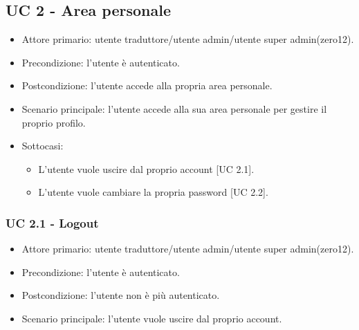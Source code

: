 \subsection{UC 2 - Area personale}
    \begin{itemize}
        \item Attore primario: utente traduttore/utente admin/utente super admin(zero12).
        \item Precondizione: l'utente è autenticato.
        \item Postcondizione: l'utente accede alla propria area personale.
        \item Scenario principale: l'utente accede alla sua area personale per gestire il proprio profilo.
        \item Sottocasi:
            \begin{itemize}
                \item L'utente vuole uscire dal proprio account [UC 2.1].
                \item L'utente vuole cambiare la propria password [UC 2.2].
            \end{itemize}
    \end{itemize}
    \subsubsection{UC 2.1 - Logout}
        \begin{itemize}
            \item Attore primario: utente traduttore/utente admin/utente super admin(zero12).
            \item Precondizione: l'utente è autenticato.
            \item Postcondizione: l'utente non è più autenticato.
            \item Scenario principale: l'utente vuole uscire dal proprio account.
        \end{itemize}
